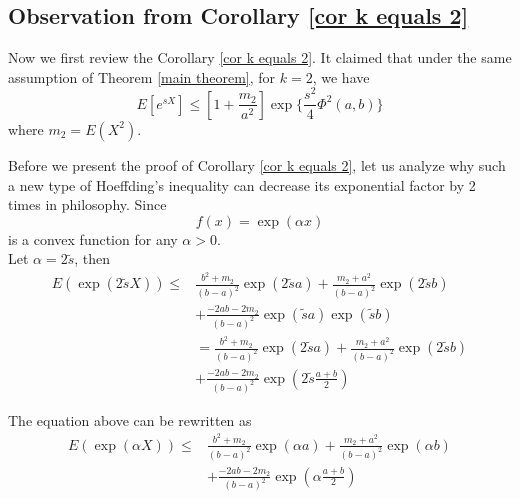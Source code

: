 \documentclass[journal]{IEEEtran}
\begin{document}
\subsection{Observation from Corollary \ref{cor k equals 2}}

Now we first review the Corollary \ref{cor k equals 2}. It claimed that under the same assumption of Theorem \ref{main theorem}, for $k=2$, we have
\begin{equation}
  E[e^{sX}]\leq [1+\frac{m_2}{a^2}] \exp\Big\{\frac{s^2}{4}\Phi^2(a,b)\Big\}
\end{equation}
where $m_2=E(X^2)$.

Before we present the proof of Corollary \ref{cor k equals 2}, let us analyze why such a new type of Hoeffding's inequality can decrease its exponential factor by 2 times in philosophy.
Since
\begin{equation*}
f(x)=\exp(\alpha x)
\end{equation*}
 is a convex function for any $\alpha>0$. \\

Let $\alpha =2\tilde{s}$, then
\begin{equation}
\begin{split}
  E(\exp(2\tilde{s}X))\leq {} &\frac{b^2+m_2}{(b-a)^2}\exp(2\tilde{s}a)+\frac{m_2+a^2}{(b-a)^2}\exp(2\tilde{s}b){}\\
  &+\frac{-2ab-2m_2}{(b-a)^2}\exp(\tilde{s}a)\exp(\tilde{s}b)\\
  & =\frac{b^2+m_2}{(b-a)^2}\exp(2\tilde{s}a)+\frac{m_2+a^2}{(b-a)^2}\exp(2\tilde{s}b)\\
 & +\frac{-2ab-2m_2}{(b-a)^2}\exp(2\tilde{s}\frac{a+b}{2})
  \end{split}
\end{equation}


The equation above can be rewritten as
\begin{equation}\label{alpha 2}
\begin{split}
  E(\exp(\alpha X))\leq &{} \frac{b^2+m_2}{(b-a)^2}\exp(\alpha a)+\frac{m_2+a^2}{(b-a)^2}\exp(\alpha b){}\\
  &+\frac{-2ab-2m_2}{(b-a)^2}\exp(\alpha \frac{a+b}{2})
  \end{split}
\end{equation}
\end{document}
